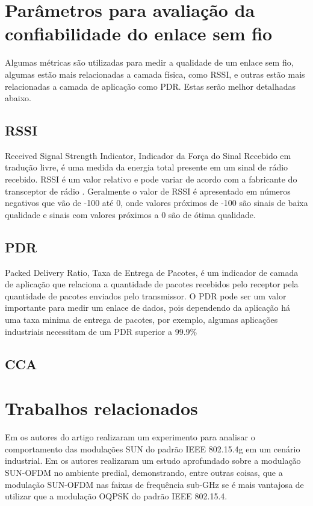 \section{Parâmetros para avaliação da confiabilidade do enlace sem fio}
\label{paramSF}
Algumas métricas são utilizadas para medir a qualidade de um enlace sem fio, algumas estão mais relacionadas a camada física, como RSSI, e outras estão mais relacionadas a camada de aplicação como PDR. Estas serão melhor detalhadas abaixo.
\subsection*{RSSI}
Received Signal Strength Indicator, Indicador da Força do Sinal Recebido em tradução livre, é uma medida da energia total presente em um sinal de rádio recebido. RSSI é um valor relativo e pode variar de acordo com a fabricante do transceptor de rádio \cite{UNDERSTANDING_RSSI}. Geralmente o valor de RSSI é apresentado em números negativos que vão de -100 até 0, onde valores próximos de -100 são sinais de baixa qualidade e sinais com valores próximos a 0 são de ótima qualidade.

\subsection*{PDR}
Packed Delivery Ratio, Taxa de Entrega de Pacotes, é um indicador de camada de aplicação que relaciona a quantidade de pacotes recebidos pelo receptor pela quantidade de pacotes enviados pelo transmissor. O PDR pode ser um valor importante para medir um enlace de dados, pois dependendo da aplicação há uma taxa minima de entrega de pacotes, por exemplo, algumas aplicações industriais necessitam de um PDR superior a 99.9\%

\subsection*{CCA}

\section{Trabalhos relacionados}
Em \cite{tuset2020dataset} os autores do artigo realizaram um experimento para analisar o comportamento das modulações SUN do padrão IEEE 802.15.4g em um cenário industrial. Em  \cite{munoz2018overview} os autores realizaram um estudo aprofundado sobre a modulação SUN-OFDM no ambiente predial, demonstrando, entre outras coisas, que a modulação SUN-OFDM nas faixas de frequência sub-GHz se é mais vantajosa de utilizar que a modulação OQPSK do padrão IEEE 802.15.4.
